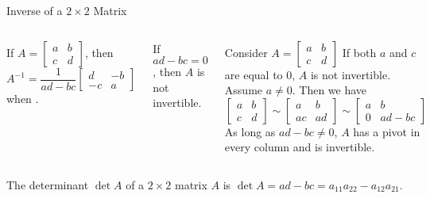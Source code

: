\documentclass[xcolor=dvipsnames,aspectratio=169,t]{beamer}
\begin{document}
\begin{frame}{Inverse of a $2 \times 2$ Matrix}

\begin{columns}[T]

\column{0.5\tw}
\bbox
If $A = \begin{bmatrix} a & b \\ c & d \end{bmatrix}$, then
\[ A^{-1} = \frac{1}{ad-bc} \begin{bmatrix} d & -b \\ -c & a \end{bmatrix} \]
when .

If \alert{$ad -bc=0$, then $A$ is not invertible}.
\ebox



\column{0.5\tw}

Consider $A = \begin{bmatrix} a & b \\ c & d \end{bmatrix}$
\bi
\ii If both $a$ and $c$ are equal to 0, $A$ is not invertible. Assume $a \ne 0$.
\ii Then we have 
\[ \begin{bmatrix} a & b \\ c & d \end{bmatrix} \sim  \begin{bmatrix} a & b \\ ac & ad \end{bmatrix}
\sim   \begin{bmatrix} a & b \\ 0 & ad - bc \end{bmatrix} \]
\ii \alert{As long as $ad - bc \ne 0$, $A$ has a pivot in every column and is invertible.}
\ei

\end{columns}

\bbox
The \alert{determinant $\det A$} of a $2 \times 2$ matrix $A$ is \alert{$\det A = ad-bc = a_{11}a_{22} - a_{12}a_{21}$}.
\ebox

\end{frame}
\end{document}

